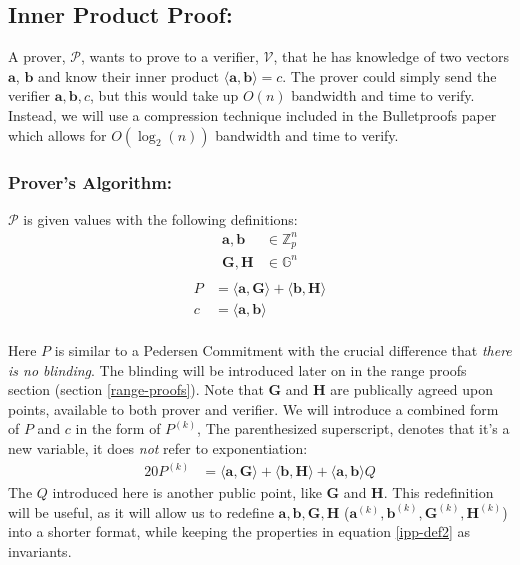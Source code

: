 \documentclass{article}
\newcommand{\eq}[1]{\begin{alignat*}{20}#1\end{alignat*}}
\newcommand{\eqn}[2]{\begin{equation}\label{#1}\begin{split}#2\end{split}\end{equation}}
\renewcommand{\vec}[1]{\boldsymbol{#1}}
\newcommand{\V}{\mathcal{V}}
\renewcommand{\P}{\mathcal{P}}
\newcommand{\G}{\mathbb{G}}
\newcommand{\Z}{\mathbb{Z}}
\newcommand{\dotp}[2]{\langle #1, #2 \rangle}
\begin{document}
\subsection{Inner Product Proof:} \label{inner-product-proof}
A prover, $\P$, wants to prove to a verifier, $\V$, that he has
knowledge of two vectors $\vec{a}$, $\vec{b}$ and know their inner
product $\dotp{\vec{a}}{\vec{b}} = c$. The prover could simply send
the verifier $\vec{a}, \vec{b}, c$, but this would take up $O(n)$
bandwidth and time to verify. Instead, we will use a compression
technique included in the Bulletproofs paper which allows for
$O(\log_2(n))$ bandwidth and time to verify.

\newpage

\subsubsection{Prover's Algorithm:}
$\P$ is given values with the following definitions:
\eqn{ipp-def1}{
	\vec{a}, \vec{b} &\in \Z^n_p \\
	\vec{G}, \vec{H} &\in \G^n \\
}
\eqn{ipp-def2}{
	P &= \dotp{\vec{a}}{\vec{G}} + \dotp{\vec{b}}{\vec{H}} \\
	c &= \dotp{\vec{a}}{\vec{b}} \\
}

Here $P$ is similar to a Pedersen Commitment with the crucial difference
that \textit{there is no blinding}. The blinding will be introduced
later on in the range proofs section (section \ref{range-proofs}). Note
that $\vec{G}$ and $\vec{H}$ are publically agreed upon points,
available to both prover and verifier. We will introduce a combined
form of $P$ and $c$ in the form of $P^{(k)}$, The parenthesized
superscript, denotes that it's a new variable, it does \textit{not}
refer to exponentiation:
\eq{
	P^{(k)} &= \dotp{\vec{a}}{\vec{G}} +
	           \dotp{\vec{b}}{\vec{H}} +
	           \dotp{\vec{a}}{\vec{b}}Q
} 
The $Q$ introduced here is another public point,
like $\vec{G}$ and $\vec{H}$. This redefinition will be useful, as
it will allow us to redefine $\vec{a}, \vec{b}, \vec{G}, \vec{H}$
($\vec{a}^{(k)}, \vec{b}^{(k)}, \vec{G}^{(k)}, \vec{H}^{(k)}$) into a
shorter format, while keeping the properties in equation \ref{ipp-def2}
as invariants.
\end{document}
